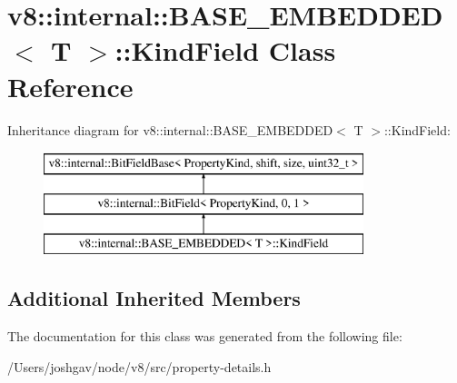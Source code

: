 \hypertarget{classv8_1_1internal_1_1_b_a_s_e___e_m_b_e_d_d_e_d_1_1_kind_field}{}\section{v8\+:\+:internal\+:\+:B\+A\+S\+E\+\_\+\+E\+M\+B\+E\+D\+D\+ED$<$ T $>$\+:\+:Kind\+Field Class Reference}
\label{classv8_1_1internal_1_1_b_a_s_e___e_m_b_e_d_d_e_d_1_1_kind_field}
Inheritance diagram for v8\+:\+:internal\+:\+:B\+A\+S\+E\+\_\+\+E\+M\+B\+E\+D\+D\+ED$<$ T $>$\+:\+:Kind\+Field\+:\begin{figure}[H]
\begin{center}
\leavevmode
\includegraphics[height=3.000000cm]{classv8_1_1internal_1_1_b_a_s_e___e_m_b_e_d_d_e_d_1_1_kind_field}
\end{center}
\end{figure}
\subsection*{Additional Inherited Members}


The documentation for this class was generated from the following file\+:\begin{DoxyCompactItemize}
\item 
/\+Users/joshgav/node/v8/src/property-\/details.\+h\end{DoxyCompactItemize}
